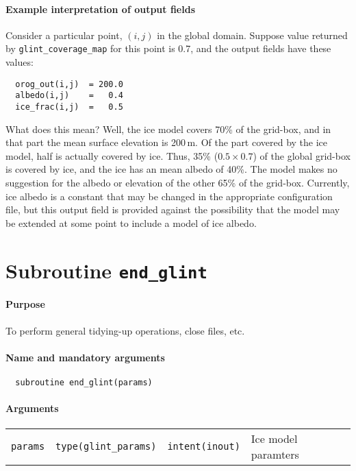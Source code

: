 \paragraph{Example interpretation of output fields}
%
Consider a particular point, $(i,j)$ in the global domain. Suppose value
returned by \texttt{glint\_coverage\_map} for this point is 0.7, and the
output fields have these values:
\begin{verbatim}
  orog_out(i,j)  = 200.0
  albedo(i,j)    =   0.4
  ice_frac(i,j)  =   0.5
\end{verbatim}
%
What does this mean? Well, the ice model covers 70\% of the grid-box, and in
that part the mean surface elevation is 200\,m. Of the part covered by the ice
model, half is actually covered by ice. Thus, 35\% ($0.5\times 0.7$) of the global grid-box is
covered by ice, and the ice has an mean albedo of 40\%. The model makes no suggestion for the
albedo or elevation of the other 65\% of the grid-box. Currently, ice albedo
is a constant that may be changed in the appropriate configuration file, but
this output field is provided against the possibility that the model may be
extended at some point to include a model of ice albedo.
%
%
\newpage
\section{Subroutine \texttt{end\_glint}}
%
\paragraph{Purpose} To perform general tidying-up operations, close files, etc.
%
\paragraph{Name and mandatory arguments}
%
\begin{verbatim}
  subroutine end_glint(params)
\end{verbatim}
%
\paragraph{Arguments}
%
\begin{center}
  \tablefirsthead{%
    \hline
  } 
      \tablelasttail{\hline}
        \begin{supertabular}{lllp{5.5cm}}
	  \texttt{params} & \texttt{type(glint\_params)} & \texttt{intent(inout)} & Ice model paramters \\
\end{supertabular}
\end{center}
%
%
